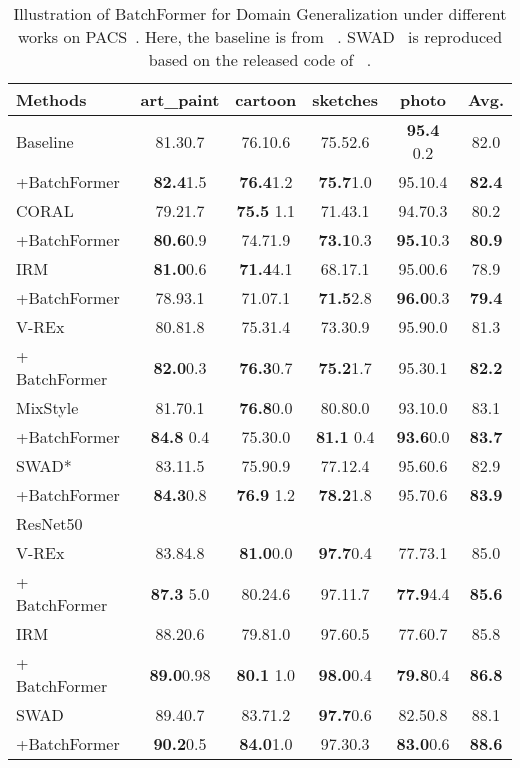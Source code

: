 \documentclass[10pt,twocolumn,letterpaper]{article}
\begin{document}
\begin{table}[tp]
\setlength\tabcolsep{2.5pt}
\small
\caption{Illustration of BatchFormer for Domain Generalization under different works on PACS~\cite{li2017deeper}. Here, the baseline is from ~\cite{dalib}. SWAD~\cite{cha2021swad} is reproduced based on the released code of ~\cite{cha2021swad}.}
\label{table:dg_pacs_app}
\centering
\begin{tabular}{@{}lccccc@{}}
\hline
Methods  & art\_paint & cartoon & sketches & photo & Avg.  \\
\hline
Baseline & 81.30.7 & 76.10.6 & 75.52.6 & {\bf 95.4} 0.2 & 82.0 \\
+BatchFormer & {\bf 82.4}1.5  & {\bf 76.4}1.2  &  {\bf 75.7}1.0 & 95.10.4 & {\bf 82.4} \\
\hline
CORAL~\cite{deep_coral} & 79.21.7 &  {\bf 75.5} 1.1 & 71.43.1 & 94.70.3 &  80.2 \\
+BatchFormer & {\bf 80.6}0.9 &  74.71.9 & {\bf 73.1}0.3& {\bf 95.1}0.3 & {\bf 80.9} \\


\hline
IRM~\cite{arjovsky2019invariant} & {\bf 81.0}0.6 &  {\bf 71.4}4.1 & 68.17.1 & 95.00.6 &     78.9 \\
+BatchFormer & 78.93.1 &  71.07.1 &   {\bf 71.5}2.8 & {\bf 96.0}0.3   & {\bf 79.4}\\
\hline
V-REx~\cite{VREx} & 80.81.8 & 75.31.4 & 73.30.9 & 95.90.0 & 81.3 \\
+ BatchFormer & {\bf 82.0}0.3 & {\bf 76.3}0.7 & {\bf 75.2}1.7 & 95.30.1 & {\bf 82.2} \\
\hline
MixStyle~\cite{zhou2021mixstyle} & 81.70.1 &  {\bf 76.8}0.0 & 80.80.0 &  93.10.0 & 83.1 \\
+BatchFormer & {\bf 84.8} 0.4 &  75.30.0 &  {\bf 81.1} 0.4 & {\bf 93.6}0.0 &  {\bf 83.7}\\
\hline
SWAD*~\cite{cha2021swad} & 83.11.5 & 75.90.9 &  77.12.4 & 95.60.6 & 82.9\\
+BatchFormer& {\bf 84.3}0.8 & {\bf 76.9} 1.2 & {\bf 78.2}1.8 & 95.70.6 &  {\bf 83.9}\\
\hline\hline
ResNet50 \\
\hline\hline
V-REx~\cite{VREx}     &  83.84.8& {\bf 81.0}0.0 & {\bf 97.7}0.4 &   77.73.1   & 85.0 \\
+ BatchFormer     &  {\bf 87.3} 5.0  &  80.24.6 &  97.11.7 &   {\bf 77.9}4.4   & {\bf 85.6} \\
\hline
IRM~\cite{arjovsky2019invariant} & 88.20.6  & 79.81.0 &97.60.5 & 77.60.7 & 85.8 \\
+ BatchFormer & {\bf 89.0}0.98 & {\bf  80.1 }1.0 &{\bf 98.0}0.4 & {\bf 79.8}0.4 & {\bf 86.8} \\
\hline
SWAD~\cite{cha2021swad} & 89.40.7 & 83.71.2 & {\bf 97.7}0.6 & 82.50.8 & 88.1\\
+BatchFormer& {\bf 90.2}0.5 & {\bf 84.0}1.0 & 97.30.3 & {\bf 83.0}0.6 & {\bf 88.6}\\
\hline
\end{tabular}
\end{table}
\end{document}
